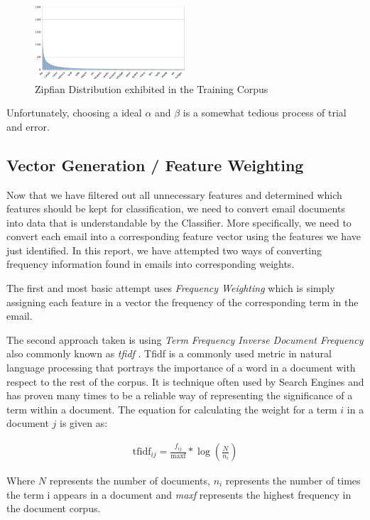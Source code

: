 \begin{figure}[h!]
	\label{zipfian}
    \centering
    \includegraphics[width=0.5\textwidth]{zipfian.png}
    \caption{Zipfian Distribution exhibited in the Training Corpus}
    \label{zipfian}
\end{figure}

Unfortunately, choosing a ideal \(\alpha \) and \(\beta\) is a somewhat tedious process of trial and error. 

\todo{\dots}






\subsection{Vector Generation / Feature Weighting}

Now that we have filtered out all unnecessary features and determined which features should be kept for classification, we need to convert email documents into data that is understandable by the Classifier. More specifically, we need to convert each email into a corresponding feature vector using the features we have just identified. In this report, we have attempted two ways of converting frequency information found in emails into corresponding weights. 

The first and most basic attempt uses {\it Frequency Weighting} which is simply assigning each feature in a vector the frequency of the corresponding term in the email. 

The second approach taken is using {\it Term Frequency Inverse Document Frequency} also commonly known as {\it tfidf} \cite{tfidf1973}. Tfidf is a commonly used metric in natural language processing that portrays the importance of a word in a document with respect to the rest of the corpus. It is technique often used by Search Engines and has proven many times to be a reliable way of representing the significance of a term within a document. The equation for calculating the weight for a term $i$ in a document $j$ is given as:

\begin{align*}
	\textrm{tfidf}_{ij} = \frac{f_{ij}}{\textrm{maxf}} * \log\left(\frac{N}{n_i}\right)
\end{align*}

Where $N$ represents the number of documents, $n_i$ represents the number of times the term i appears in a document and \emph{maxf} represents the highest frequency in the document corpus.
